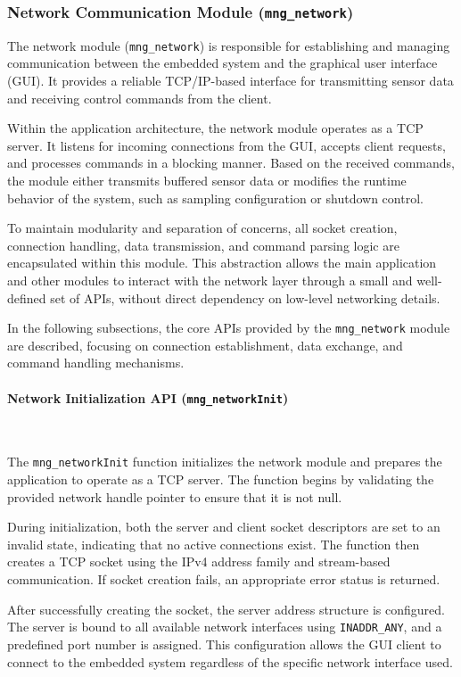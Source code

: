 \subsubsection{Network Communication Module (\texttt{mng\_network})}

The network module (\texttt{mng\_network}) is responsible for establishing and managing 
communication between the embedded system and the graphical user interface (GUI). 
It provides a reliable TCP/IP-based interface for transmitting sensor data and 
receiving control commands from the client.

Within the application architecture, the network module operates as a TCP server. It 
listens for incoming connections from the GUI, accepts client requests, and processes 
commands in a blocking manner. Based on the received commands, the module either 
transmits buffered sensor data or modifies the runtime behavior of the system, such as 
sampling configuration or shutdown control.

To maintain modularity and separation of concerns, all socket creation, connection 
handling, data transmission, and command parsing logic are encapsulated within this 
module. This abstraction allows the main application and other modules to interact with 
the network layer through a small and well-defined set of APIs, without direct 
dependency on low-level networking details.

In the following subsections, the core APIs provided by the \texttt{mng\_network} module 
are described, focusing on connection establishment, data exchange, and command 
handling mechanisms.


\paragraph{Network Initialization API (\texttt{mng\_networkInit})}\

The \texttt{mng\_networkInit} function initializes the network module and prepares the 
application to operate as a TCP server. The function begins by validating the provided 
network handle pointer to ensure that it is not null.

During initialization, both the server and client socket descriptors are set to an 
invalid state, indicating that no active connections exist. The function then creates 
a TCP socket using the IPv4 address family and stream-based communication. If socket 
creation fails, an appropriate error status is returned.

After successfully creating the socket, the server address structure is configured. 
The server is bound to all available network interfaces using \texttt{INADDR\_ANY}, and 
a predefined port number is assigned. This configuration allows the GUI client to connect 
to the embedded system regardless of the specific network interface used.

